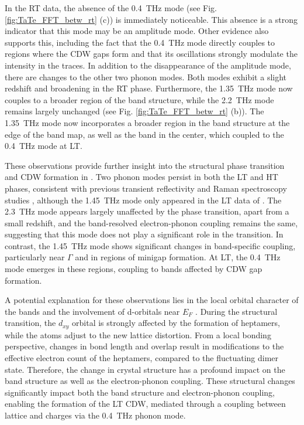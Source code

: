 In the RT data, the absence of the \qty{0.4}{\tera\hertz} mode (see Fig. \ref{fig:TaTe_FFT_betw_rt} (c)) is immediately noticeable.
This absence is a strong indicator that this mode may be an amplitude mode.
Other evidence also supports this, including the fact that the \qty{0.4}{\tera\hertz} mode directly couples to regions where the CDW gaps form and that its oscillations strongly modulate the intensity in the traces.
In addition to the disappearance of the amplitude mode, there are changes to the other two phonon modes.
Both modes exhibit a slight redshift and broadening in the RT phase.
Furthermore, the \qty{1.35}{\tera\hertz} mode now couples to a broader region of the band structure, while the \qty{2.2}{\tera\hertz} mode remains largely unchanged (see Fig. \ref{fig:TaTe_FFT_betw_rt} (b)).
The \qty{1.35}{\tera\hertz} mode now incorporates a broader region in the band structure at the edge of the band map, as well as the band in the center, which coupled to the \qty{0.4}{\tera\hertz} mode at LT.

These observations provide further insight into the structural phase transition and CDW formation in .
Two phonon modes persist in both the LT and HT phases, consistent with previous transient reflectivity and Raman spectroscopy studies \cite{hu_optical_2022, luo_subtle_2021}, although the \qty{1.45}{\tera\hertz} mode only appeared in the LT data of \cite{hu_optical_2022}.
The \qty{2.3}{\tera\hertz} mode appears largely unaffected by the phase transition, apart from a small redshift, and the band-resolved electron-phonon coupling remains the same, suggesting that this mode does not play a significant role in the transition.
In contrast, the \qty{1.45}{\tera\hertz} mode shows significant changes in band-specific coupling, particularly near $\Gamma$ and in regions of minigap formation.
At LT, the \qty{0.4}{\tera\hertz} mode emerges in these regions, coupling to bands affected by CDW gap formation.

A potential explanation for these observations lies in the local orbital character of the bands and the involvement of  d-orbitals near $E_F$ \cite{mitsuishi_unveiling_2024}.
During the structural transition, the  $d_{xy}$ orbital is strongly affected by the formation of heptamers, while the  atoms adjust to the new lattice distortion.
From a local bonding perspective, changes in bond length and overlap result in modifications to the effective electron count of the heptamers, compared to the fluctuating dimer state.
Therefore, the change in crystal structure has a profound impact on the band structure as well as the electron-phonon coupling.
These structural changes significantly impact both the band structure and electron-phonon coupling, enabling the formation of the LT CDW, mediated through a coupling between lattice and charges via the \qty{0.4}{\tera\hertz} phonon mode.

